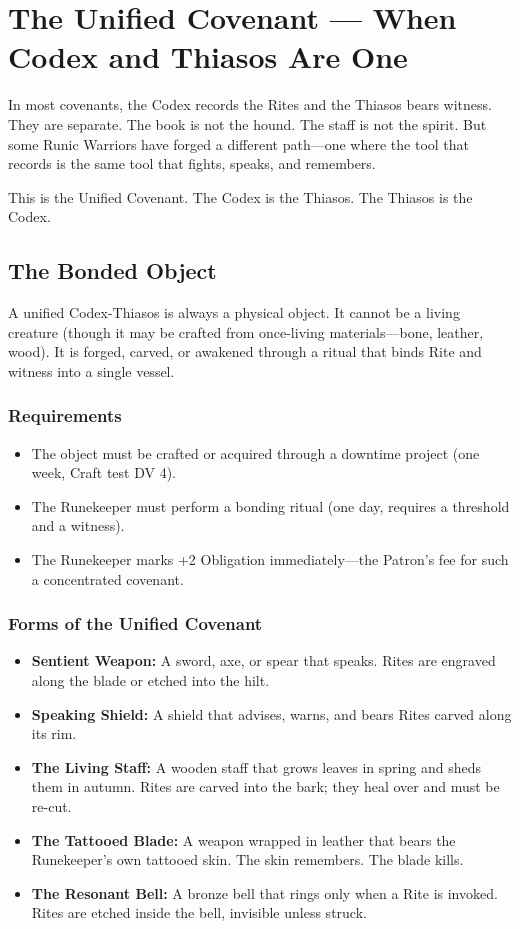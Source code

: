 \section{The Unified Covenant — When Codex and Thiasos Are One}

In most covenants, the Codex records the Rites and the Thiasos bears witness. They are separate. The book is not the hound. The staff is not the spirit. But some Runic Warriors have forged a different path—one where the tool that records is the same tool that fights, speaks, and remembers.

This is the Unified Covenant. The Codex is the Thiasos. The Thiasos is the Codex.

\subsection{The Bonded Object}

A unified Codex-Thiasos is always a physical object. It cannot be a living creature (though it may be crafted from once-living materials—bone, leather, wood). It is forged, carved, or awakened through a ritual that binds Rite and witness into a single vessel.

\subsubsection{Requirements}

\begin{itemize}
\item The object must be crafted or acquired through a downtime project (one week, Craft test DV 4).
\item The Runekeeper must perform a bonding ritual (one day, requires a threshold and a witness).
\item The Runekeeper marks +2 Obligation immediately—the Patron's fee for such a concentrated covenant.
\end{itemize}

\subsubsection{Forms of the Unified Covenant}

\begin{itemize}
\item \textbf{Sentient Weapon:} A sword, axe, or spear that speaks. Rites are engraved along the blade or etched into the hilt.
\item \textbf{Speaking Shield:} A shield that advises, warns, and bears Rites carved along its rim.
\item \textbf{The Living Staff:} A wooden staff that grows leaves in spring and sheds them in autumn. Rites are carved into the bark; they heal over and must be re-cut.
\item \textbf{The Tattooed Blade:} A weapon wrapped in leather that bears the Runekeeper's own tattooed skin. The skin remembers. The blade kills.
\item \textbf{The Resonant Bell:} A bronze bell that rings only when a Rite is invoked. Rites are etched inside the bell, invisible unless struck.
\end{itemize}

